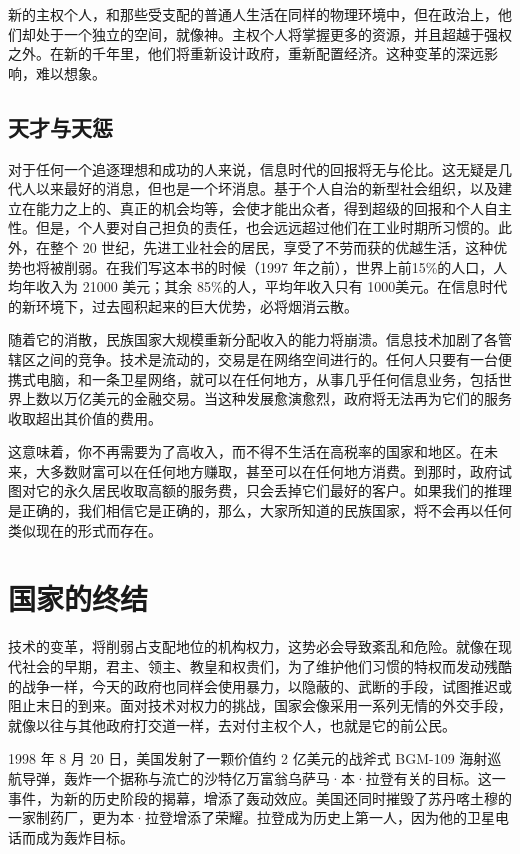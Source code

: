 新的主权个人，和那些受支配的普通人生活在同样的物理环境中，但在政治上，他们却处于一个独立的空间，就像神。主权个人将掌握更多的资源，并且超越于强权之外。在新的千年里，他们将重新设计政府，重新配置经济。这种变革的深远影响，难以想象。



\subsection{天才与天惩}
对于任何一个追逐理想和成功的人来说，信息时代的回报将无与伦比。这无疑是几代人以来最好的消息，但也是一个坏消息。基于个人自治的新型社会组织，以及建立在能力之上的、真正的机会均等，会使才能出众者，得到超级的回报和个人自主性。但是，个人要对自己担负的责任，也会远远超过他们在工业时期所习惯的。此外，在整个 20 世纪，先进工业社会的居民，享受了不劳而获的优越生活，这种优势也将被削弱。在我们写这本书的时候（1997 年之前），世界上前15\%的人口，人均年收入为 21000 美元；其余 85\%的人，平均年收入只有 1000美元。在信息时代的新环境下，过去囤积起来的巨大优势，必将烟消云散。


随着它的消散，民族国家大规模重新分配收入的能力将崩溃。信息技术加剧了各管辖区之间的竞争。技术是流动的，交易是在网络空间进行的。任何人只要有一台便携式电脑，和一条卫星网络，就可以在任何地方，从事几乎任何信息业务，包括世界上数以万亿美元的金融交易。当这种发展愈演愈烈，政府将无法再为它们的服务收取超出其价值的费用。


这意味着，你不再需要为了高收入，而不得不生活在高税率的国家和地区。在未来，大多数财富可以在任何地方赚取，甚至可以在任何地方消费。到那时，政府试图对它的永久居民收取高额的服务费，只会丢掉它们最好的客户。如果我们的推理是正确的，我们相信它是正确的，那么，大家所知道的民族国家，将不会再以任何类似现在的形式而存在。



\section{国家的终结}
技术的变革，将削弱占支配地位的机构权力，这势必会导致紊乱和危险。就像在现代社会的早期，君主、领主、教皇和权贵们，为了维护他们习惯的特权而发动残酷的战争一样，今天的政府也同样会使用暴力，以隐蔽的、武断的手段，试图推迟或阻止末日的到来。面对技术对权力的挑战，国家会像采用一系列无情的外交手段，就像以往与其他政府打交道一样，去对付主权个人，也就是它的前公民。


1998 年 8 月 20 日，美国发射了一颗价值约 2 亿美元的战斧式 BGM-109 海射巡航导弹，轰炸一个据称与流亡的沙特亿万富翁乌萨马·本·拉登有关的目标。这一事件，为新的历史阶段的揭幕，增添了轰动效应。美国还同时摧毁了苏丹喀土穆的一家制药厂，更为本·拉登增添了荣耀。拉登成为历史上第一人，因为他的卫星电话而成为轰炸目标。


